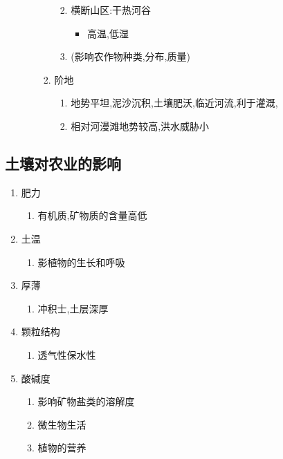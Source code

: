 \documentclass[a4paper]{article}
\begin{document}
\begin{enumerate}
\begin{enumerate}
\begin{enumerate}
\begin{enumerate}
\begin{itemize}
                    \end{itemize}
                    \item 横断山区:干热河谷
                    \begin{itemize}
                        \item 高温,低湿
                    \end{itemize}
                    \item (影响农作物种类,分布,质量)
                \end{enumerate}
                \item 阶地
                \begin{enumerate}
                    \item 地势平坦,泥沙沉积,土壤肥沃,临近河流,利于灌溉,
                    \item 相对河漫滩地势较高,洪水威胁小
                \end{enumerate}
            \end{enumerate}
        \end{enumerate}
    \end{enumerate}
    \subsection{土壤对农业的影响}
    \begin{enumerate}
        \item 肥力
        \begin{enumerate}
            \item 有机质,矿物质的含量高低
        \end{enumerate}
        \item 土温
        \begin{enumerate}
            \item 影植物的生长和呼吸
        \end{enumerate}
        \item 厚薄
        \begin{enumerate}
            \item 冲积士,土层深厚
        \end{enumerate}
        \item 颗粒结构
        \begin{enumerate}
            \item 透气性保水性
        \end{enumerate}
        \item 酸碱度
        \begin{enumerate}
            \item 影响矿物盐类的溶解度
            \item 微生物生活
            \item 植物的营养
        \end{enumerate}
    \end{enumerate}
\end{document}
